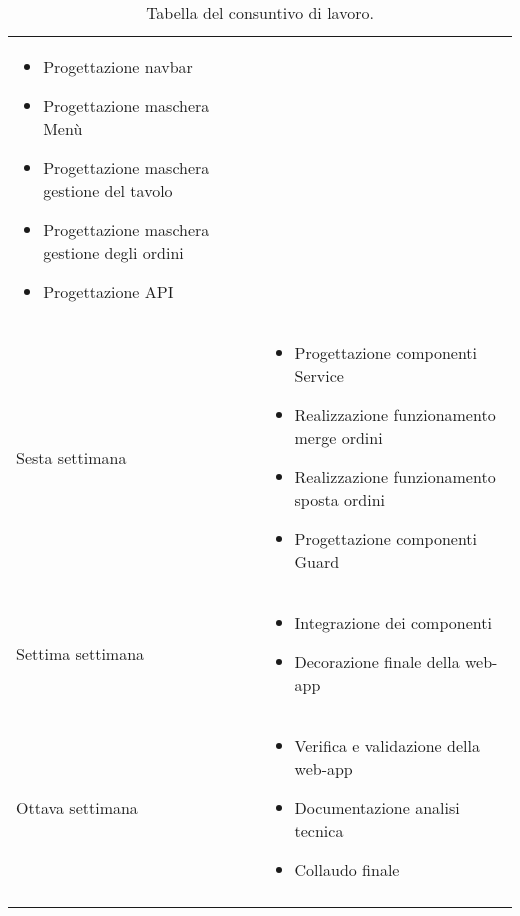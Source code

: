 \begin{center}
\begin{longtable}{ |p{3cm}|p{9cm}|  }
\begin{itemize}
            \item Progettazione navbar
            \item Progettazione maschera Menù
            \item Progettazione maschera gestione del tavolo
            \item Progettazione maschera gestione degli ordini
            \item Progettazione API
        \end{itemize}\\
        Sesta settimana&\begin{itemize}
            \item Progettazione componenti Service
            \item Realizzazione funzionamento merge ordini
            \item Realizzazione funzionamento sposta ordini
            \item Progettazione componenti Guard
        \end{itemize}\\
        Settima settimana&\begin{itemize}
            \item Integrazione dei componenti
            \item Decorazione finale della web-app
        \end{itemize}\\
        Ottava settimana&\begin{itemize}
            \item Verifica e validazione della web-app
            \item Documentazione analisi tecnica
            \item Collaudo finale
        \end{itemize}\\
\hline
\caption{\label{tab:tabella consuntivo lavoro}Tabella del consuntivo di lavoro.}
\end{longtable}
\end{center}
\pagebreak



